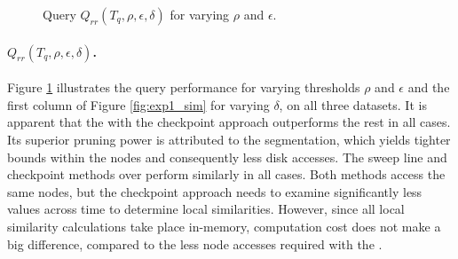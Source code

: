 \begin{figure}[ht!]
 \quad
{}
\caption{Query $Q_{rr}(T_q, \rho, \epsilon, \delta)$ for varying $\rho$ and $\epsilon$.}
\label{fig:query1a}
\end{figure}

\paragraph{$Q_{rr}(T_q, \rho, \epsilon, \delta)$.} Figure \ref{fig:query1a} illustrates the query performance for varying thresholds $\rho$ and $\epsilon$ and the first column of Figure \ref{fig:exp1_sim} for varying $\delta$, on all three datasets. It is apparent that the \sbtsr with the checkpoint approach outperforms the rest in all cases. Its superior pruning power is attributed to the segmentation, which yields tighter bounds within the nodes and consequently less disk accesses. The sweep line and checkpoint methods over \btsr perform similarly in all cases. Both methods access the same nodes, but the checkpoint approach needs to examine significantly less values across time to determine local similarities. However, since all local similarity calculations take place in-memory, computation cost does not make a big difference, compared to the less node accesses required with the \sbtsr. 


